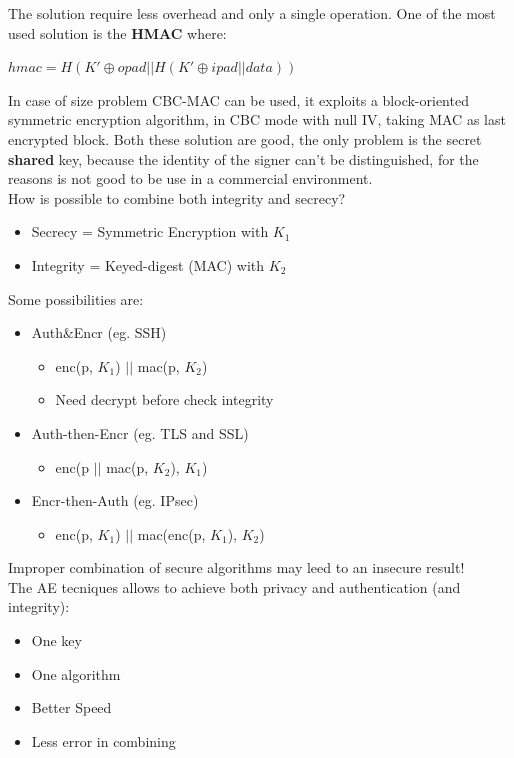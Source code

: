 \documentclass[12pt]{article}
\begin{document}
The solution require less overhead and only a single operation.
One of the most used solution is the \textbf{HMAC} where:
\begin{center}
  $hmac = H(K' \oplus opad || H(K' \oplus ipad || data))$
\end{center}
In case of size problem CBC-MAC can be used, it exploits a block-oriented symmetric encryption algorithm, in CBC mode with null IV, taking MAC as last encrypted block.
Both these solution are good, the only problem is the secret \textbf{shared} key, because the identity of the signer can't be distinguished, for the reasons is not good to be use in a commercial environment.\\
How is possible to combine both integrity and secrecy?
\begin{itemize}
  \item Secrecy = Symmetric Encryption with $K_{1}$
  \item Integrity = Keyed-digest (MAC) with $K_{2}$
\end{itemize}
Some possibilities are:
\begin{itemize}
  \item Auth\&Encr (eg. SSH)
  \begin{itemize}
    \item enc(p, $K_{1}$) $||$ mac(p, $K_{2}$)
    \item Need decrypt before check integrity
  \end{itemize}
  \item Auth-then-Encr (eg. TLS and SSL)
  \begin{itemize}
    \item enc(p $||$ mac(p, $K_{2}$), $K_{1}$)
  \end{itemize}
  \item Encr-then-Auth (eg. IPsec)
  \begin{itemize}
    \item enc(p, $K_{1}$) $||$ mac(enc(p, $K_{1}$), $K_{2}$)
  \end{itemize}
\end{itemize}
Improper combination of secure algorithms may leed to an insecure result!\\
The AE tecniques allows to achieve both privacy and authentication (and integrity):
\begin{itemize}
  \item One key
  \item One algorithm
  \item Better Speed
  \item Less error in combining
\end{itemize}
\end{document}
